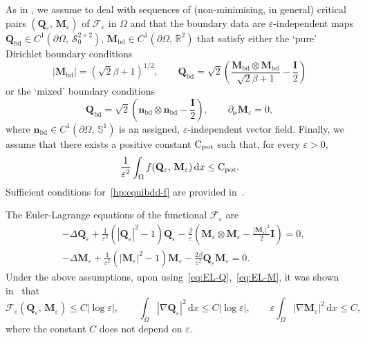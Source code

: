 \documentclass[a4paper, 11pt, twoside, leqno]{article}
\theoremstyle{definition}              %
\theoremstyle{remark}                  %
\newcommand{\abs}[1]{\left| #1 \right|}                             %
\renewcommand{\d}{\mathrm{d}}
\newcommand{\R}{\mathbb{R}}
\newcommand{\Q}{\mathbf{Q}}
\newcommand{\M}{\mathbf{M}}
\newcommand{\I}{\mathbf{I}}
\newcommand{\n}{\mathbf{n}}
\newcommand{\F}{\mathscr{F}}
\newcommand{\eps}{\varepsilon}
\newcommand{\Cpot}{{\rm C}_{\rm pot}}
\newcommand{\nnu}{{\boldsymbol{\nu}}}
\newcommand{\Sz}{\mathscr{S}_0^{2\times 2}}
\newcommand{\Qb}{\Q_{\mathrm{bd}}}
\newcommand{\Mb}{\M_{\mathrm{bd}}}
\newcommand{\nb}{\n_{\mathrm{bd}}}
\newcommand{\bbS}{\mathbb{S}}
\begin{document}
As in \cite{CDS1, CDS2}, 
we assume to deal with sequences of (non-minimising, in general) 
critical pairs $(\Q_\eps,\,\M_\eps)$ of $\F_\eps$ in $\Omega$ 
and that the boundary data are $\eps$-independent maps 
$\Qb \in C^1(\partial \Omega,\,\Sz)$, $\Mb \in C^1(\partial \Omega,\,\R^2)$ that satisfy either the `pure' Dirichlet boundary conditions 
\begin{equation}\label{hp:bc-dir}
    \abs{\Mb} = \left(\sqrt{2}\beta + 1 \right)^{1/2}, \qquad
    \Qb = \sqrt{2}\left(\frac{\Mb \otimes \Mb}{\sqrt{2}\beta + 1} - \frac{\I}{2}\right) 
\end{equation}
or the `mixed' boundary conditions 
\begin{equation}\label{hp:bc-mixed}
    \Qb = \sqrt{2}\left( \nb \otimes \nb - \frac{\I}{2} \right), \qquad 
    \partial_\nnu \M_\eps = 0,
\end{equation}
where $\nb \in C^1(\partial\Omega,\,\bbS^1)$ is an assigned, 
$\eps$-independent vector field. %
Finally, we assume that 
there exists a positive constant $\Cpot$ such that, for every $\eps > 0$, 
\begin{equation}\label{hp:equibdd-f}
    \frac{1}{\eps^2} \int_\Omega f(\Q_\eps,\,\M_\eps) \,{\d}x \leq \Cpot.
\end{equation}
Sufficient conditions for~\eqref{hp:equibdd-f} are provided in~\cite[Remark~1]{CDS1}.

% 

The Euler-Lagrange equations of the functional $\F_\eps$ are
\begin{align}
    &-\Delta \Q_\eps + \frac{1}{\eps^2} \left( \abs{\Q_\eps}^2 - 1 \right) \Q_\eps - \frac{\beta}{\eps}\left( \M_\eps \otimes \M_\eps - \frac{\abs{\M_\eps}^2}{2} \I\right) = 0, \label{eq:EL-Q} \\
    &-\Delta \M_\eps + \frac{1}{\eps^2}\left(\abs{\M_\eps}^2 - 1 \right)\M_\eps - \frac{2\beta}{\eps^2}\Q_\eps\M_\eps = 0\label{eq:EL-M}.
\end{align}
Under the above assumptions, upon using~\eqref{eq:EL-Q},~\eqref{eq:EL-M}, 
it was shown in~\cite{CDS1} that 
\begin{equation}\label{eq:energy-bounds}
    \F_\eps(\Q_\eps,\,\M_\eps) \leq C \abs{\log \eps}, \qquad
    \int_\Omega \abs{\nabla \Q_\eps}^2\,{\d}x \leq C \abs{\log \eps}, \qquad 
    \eps \int_\Omega \abs{\nabla \M_\eps}^2 \,{\d}x \leq C,
\end{equation}
where the constant $C$ does not depend on $\eps$. 
\end{document}
